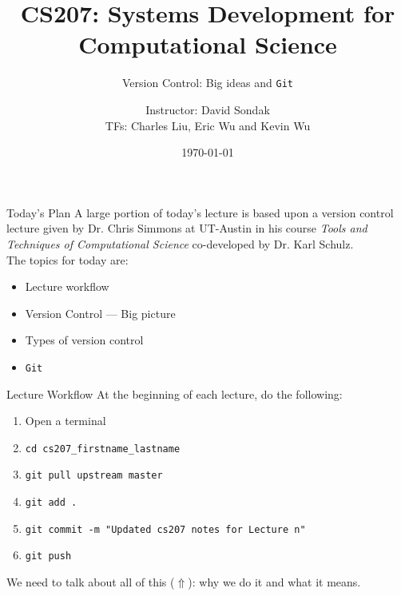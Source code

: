 \documentclass[onlymath, nologo]{beamer}
\author[]{Instructor:  David Sondak \\ TFs:  Charles Liu, Eric Wu and Kevin Wu}
\title{CS207: Systems Development for Computational Science}
\subtitle{Version Control:  Big ideas and \texttt{Git}}
\institute{Harvard University \\ 
           Institute for Applied Computational Science}
\date{\today}
\begin{document}
\bgroup
\makeatletter
{}
\makeatother

  \begin{frame}
    \titlepage
  \end{frame}
  \egroup
  
  \setcounter{framenumber}{0}

  \begin{frame}{Today's Plan}
    A large portion of today's lecture is based upon a version control lecture given by 
    Dr. Chris Simmons at UT-Austin in his course \textit{Tools and Techniques of Computational Science} 
    co-developed by Dr. Karl Schulz. \\[1.0em]
    The topics for today are:
    \begin{itemize}
      \item Lecture workflow
      \item Version Control --- Big picture 
      \item Types of version control 
      \item \texttt{Git}
    \end{itemize}
  \end{frame}

  \begin{frame}{Lecture Workflow}
    At the beginning of each lecture, do the following:
    \begin{enumerate}
      \item Open a terminal 
      \item \texttt{cd cs207\_firstname\_lastname}
      \item \texttt{git pull upstream master} 
      \item \texttt{git add .} 
      \item \texttt{git commit -m "Updated cs207 notes for Lecture n"}
      \item \texttt{git push}
    \end{enumerate}
    We need to talk about all of this ($\Uparrow$): why we do it and what it means.
  \end{frame}
\end{document}
